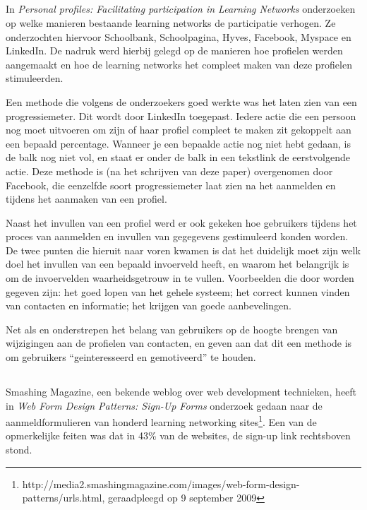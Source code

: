 \documentclass[a4paper, 10pt, pdftex]{report}
\begin{document}
    \subsection{\cite{Brouns2008}}

    In \emph{Personal profiles: Facilitating participation in Learning Networks} onderzoeken \citeauthor{Brouns2008} op welke manieren bestaande learning networks de participatie verhogen. Ze onderzochten hiervoor Schoolbank, Schoolpagina, Hyves, Facebook, Myspace en LinkedIn. De nadruk werd hierbij gelegd op de manieren hoe profielen werden aangemaakt en hoe de learning networks het compleet maken van deze profielen stimuleerden.

    Een methode die volgens de onderzoekers goed werkte was het laten zien van een progressiemeter. Dit wordt door LinkedIn toegepast. Iedere actie die een persoon nog moet uitvoeren om zijn of haar profiel compleet te maken zit gekoppelt aan een bepaald percentage. Wanneer je een bepaalde actie nog niet hebt gedaan, is de balk nog niet vol, en staat er onder de balk in een tekstlink de eerstvolgende actie. Deze methode is (na het schrijven van deze paper) overgenomen door Facebook, die eenzelfde soort progressiemeter laat zien na het aanmelden en tijdens het aanmaken van een profiel.

    Naast het invullen van een profiel werd er ook gekeken hoe gebruikers tijdens het proces van aanmelden en invullen van gegegevens gestimuleerd konden worden. De twee punten die hieruit naar voren kwamen is dat het duidelijk moet zijn welk doel het invullen van een bepaald invoerveld heeft, en waarom het belangrijk is om de invoervelden waarheidsgetrouw in te vullen. Voorbeelden die door \citeauthor{Brouns2008} worden gegeven zijn: het goed lopen van het gehele systeem; het correct kunnen vinden van contacten en informatie; het krijgen van goede aanbevelingen.

    Net als \citet{Berlanga2007} en \citet{Sohn2005} onderstrepen \citeauthor{Brouns2008} het belang van gebruikers op de hoogte brengen van wijzigingen aan de profielen van contacten, en geven aan dat dit een methode is om gebruikers ``geinteresseerd en gemotiveerd'' te houden.

    \subsection{\cite{Editorial2008}}

    Smashing Magazine, een bekende weblog over web development technieken, heeft in \emph{Web Form Design Patterns: Sign-Up Forms} onderzoek gedaan naar de aanmeldformulieren van honderd learning networking sites\footnote{http://media2.smashingmagazine.com/images/web-form-design-patterns/urls.html, geraadpleegd op 9 september 2009}. Een van de opmerkelijke feiten was dat in 43\% van de websites, de sign-up link rechtsboven stond.
\end{document}
